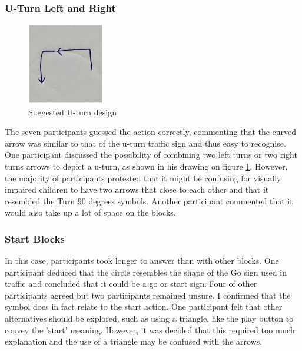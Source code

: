 \documentclass[oneside,%
                    author={Malak Hajji},
                    degree={BSc},
                    title={Designing An Accessible Computational Toolkit For Students},
                  subtitle={With Mixed Visual Abilities}]{dissertation}
\begin{document}
\subsubsection{U-Turn Left and Right}
\FloatBarrier
\begin{figure}[h]
    \centering
    \includegraphics[width=0.3\textwidth]{thesis/uturn.eps}
    \caption{Suggested U-turn design}
    \label{fig-turn}
\end{figure}
\FloatBarrier
The seven participants guessed the action correctly, commenting that the curved arrow was similar to that of the u-turn traffic sign and thus easy to recognise. One participant discussed the possibility of combining two left turns or two right turns arrows to depict a u-turn, as shown in his drawing on figure \ref{fig-turn}. However, the majority of participants protested that it might be confusing for visually impaired children to have two arrows that close to each other and that it resembled the Turn 90 degrees symbols. Another participant commented that it would also take up a lot of space on the blocks.

\subsubsection{Start Blocks}
In this case, participants took longer to answer than with other blocks. One participant deduced that the circle resembles the shape of the Go sign used in traffic and concluded that it could be a go or start sign. Four of other participants agreed but two participants remained unsure.  I confirmed that the symbol does in fact relate to the start action. One participant felt that other alternatives should be explored, such as using a triangle, like the play button to convey the 'start' meaning. However, it was decided that this required too much explanation and the use of a triangle may be confused with the arrows.
\end{document}

